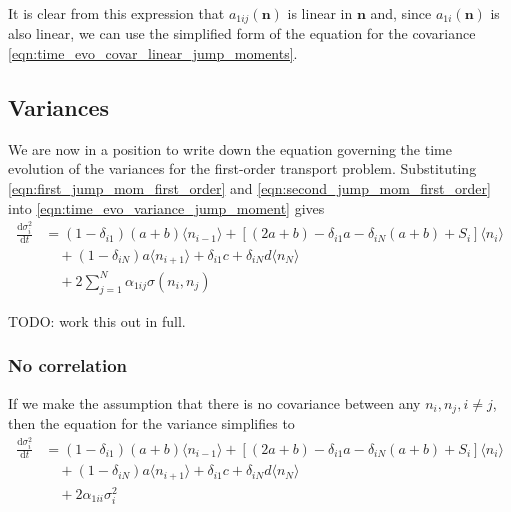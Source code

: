\documentclass[a4paper,11pt]{report}
\numberwithin{equation}{section}
\newcommand{\diff}[2]{\frac{\mathrm{d} #1}{\mathrm{d} #2}}
\newcommand{\V}[1]{\mathbf{#1}}
\newcommand{\E}[1]{\langle #1 \rangle}
\begin{document}
It is clear from this expression that \(a_{1ij}(\V{n})\) is linear in \(\V{n}\)
and, since \(a_{1i}(\V{n})\) is also linear, we can use the simplified form of
the equation for the covariance \eqref{eqn:time_evo_covar_linear_jump_moments}.

\subsection{Variances}
We are now in a position to write down the equation governing the time
evolution of the variances for the first-order transport problem. Substituting
\eqref{eqn:first_jump_mom_first_order} and
\eqref{eqn:second_jump_mom_first_order} into
\eqref{eqn:time_evo_variance_jump_moment} gives
\begin{equation}
    \begin{aligned}
        \diff{\sigma_i^2}{t} &= (1-\delta_{i1})(a+b)\E{n_{i-1}} +
        \left[(2a+b) - \delta_{i1}a - \delta_{iN}(a+b) + S_i\right]\E{n_i}\\
        &\quad+ (1-\delta_{iN})a\E{n_{i+1}} + \delta_{i1}c + \delta_{iN}d \E{n_N}\\
        &\quad+ 2 \sum_{j=1}^N \alpha_{1ij} \sigma(n_i,n_j)
    \end{aligned}
    \label{eqn:time_evo_variance_first_order}
\end{equation}

TODO: work this out in full.

\subsubsection{No correlation}
If we make the assumption that there is no covariance between any \(n_i, n_j,
i\neq j\), then the equation for the variance simplifies to
\begin{equation}
    \begin{aligned}
        \diff{\sigma_i^2}{t} &= (1-\delta_{i1})(a+b)\E{n_{i-1}} +
        \left[(2a+b) - \delta_{i1}a - \delta_{iN}(a+b) + S_i\right]\E{n_i}\\
        &\quad+ (1-\delta_{iN})a\E{n_{i+1}} + \delta_{i1}c + \delta_{iN}d \E{n_N}\\
        &\quad+ 2 \alpha_{1ii} \sigma_i^2
    \end{aligned}
    \label{eqn:time_evo_variance_first_order_no_corr}
\end{equation}
\end{document}
